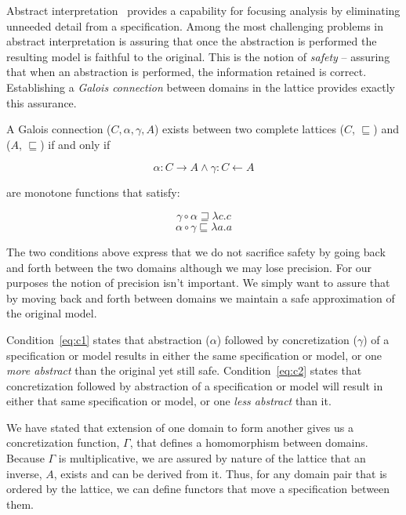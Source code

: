 \documentclass[12pt]{article}
\begin{document}
Abstract interpretation~\cite{Cousot:00:Abstract-Interp} provides a
capability for focusing analysis by eliminating unneeded detail from a
specification.  Among the most challenging problems in abstract
interpretation is assuring that once the abstraction is performed the
resulting model is faithful to the original. This is the notion of
\emph{safety} -- assuring that when an abstraction is performed, the
information retained is correct.  Establishing a \emph{Galois
  connection} \cite{Nielson:05:Principles-of-P} between domains in the
lattice provides exactly this assurance.

A Galois connection ($C,\alpha,\gamma,A$) exists between two complete
lattices ($C$, $\sqsubseteq$) and ($A$, $\sqsubseteq$) if and only if

\[\alpha:C \rightarrow A \wedge \gamma:C \leftarrow A\]

\noindent are monotone functions that satisfy:

\begin{equation}
\label{eq:c1}
\gamma \circ \alpha \sqsupseteq \lambda c.c
\end{equation}
\begin{equation}
\label{eq:c2}
\alpha \circ \gamma \sqsubseteq \lambda a.a
\end{equation}

The two conditions above express that we do not sacrifice safety by
going back and forth between the two domains although we may lose
precision.  For our purposes the notion of precision isn't important.
We simply want to assure that by moving back and forth between domains
we maintain a safe approximation of the original model.

Condition~\ref{eq:c1} states that abstraction ($\alpha$) followed by
concretization ($\gamma$) of a specification or model results in
either the same specification or model, or one \emph{more abstract}
than the original yet still safe.  Condition~\ref{eq:c2} states that
concretization followed by abstraction of a specification or model will result
in either that same specification or model, or one \emph{less abstract} than
it.

We have stated that extension of one domain to form another gives us a
concretization function, $\Gamma$, that defines a homomorphism between
domains.  Because $\Gamma$ is multiplicative, we are assured by nature
of the lattice that an inverse, $A$, exists and can be derived from
it.  Thus, for any domain pair that is ordered by the lattice, we can
define functors that move a specification between them.
\end{document}
